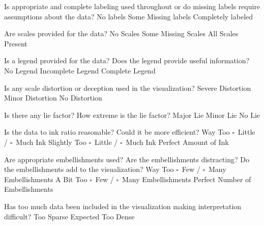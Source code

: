\documentclass[a4paper,12pt]{article}
\begin{document}
\EndTable  

\vspace{15pt}


   	{Is appropriate and complete labeling used throughout or do 
      	missing labels require assumptions about the data?}
    {\choice No labels}
    {\choice Some Missing labels}
    {\choice Completely labeled} 
        
   	{Are scales provided for the data?}
	{\choice No Scales}
	{\choice Some Missing Scales}
	{\choice All Scales Present} 

	{Is a legend provided for the data? Does the legend provide useful 
    	information?}
	{\choice No Legend}
	{\choice Incomplete Legend}
	{\choice Complete Legend} 
        
        
\EndTable  



	{Is any scale distortion or deception used in the visualization?}	
	{\choice Severe Distortion}
	{\choice Minor Distortion}
	{\choice No Distortion} 
        
	{Is there any lie factor? How extreme is the lie factor?}
	{\choice Major Lie}
	{\choice Minor Lie}
	{\choice No Lie} 

	{Is the data to ink ratio reasonable? Could it be more efficient?}
	{Way Too $\square$~Little / $\square$~Much Ink}
	{Slightly Too $\square$~Little / $\square$~Much Ink}
	{\choice Perfect Amount of Ink} 
        
	{Are appropriate embellishments used? Are the embellishments 
    	distracting? Do the embellishments add to the visualization?}
	{Way Too $\square$~Few / $\square$~Many Embellishments}
	{A Bit Too $\square$~Few / $\square$~Many Embellishments}
	{\choice Perfect Number of Embellishments} 
        
	{Has too much data been included in the visualization making 
    	interpretation difficult? } 
	{\choice Too Sparse}
	{\choice Expected}
	{\choice Too Dense} 
        
\EndTable  
        
\end{document}
